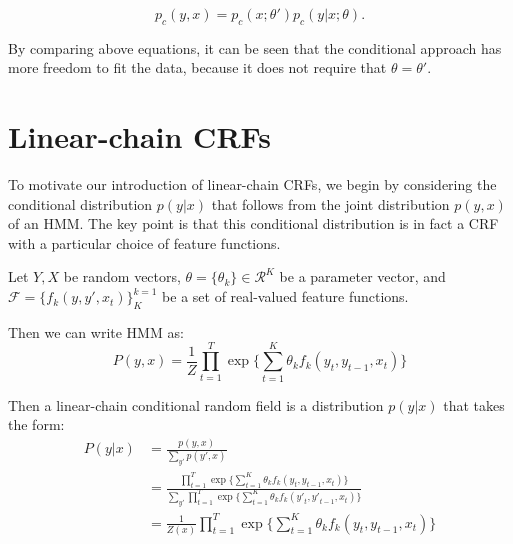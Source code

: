 \documentclass{article}
\begin{document}
\[p_c(y, x) = p_c(x; \theta')p_c(y|x; \theta).\]

By comparing above equations, it can be seen that the conditional
approach has more freedom to fit the data, because it does not require that $\theta = \theta'$. 



\section{Linear-chain CRFs}
To motivate our introduction of linear-chain CRFs, we begin by considering the conditional distribution $p(y|x)$ that follows from the joint distribution $p(y,x)$ of an HMM. The key point is that this conditional distribution is in fact a CRF with a particular choice of feature functions.

Let $Y,X$ be random vectors, $\theta = \{\theta_k\} \in \mathcal{R}^K$ be a parameter vector, and $\mathcal{F} = \{f_k(y,y',x_t)\}_{K}^{k=1}$ be a set of real-valued feature functions.

Then we can write HMM as:
\[ P(y,x) = \frac{1}{Z} \prod_{t=1}^{T} \exp \Bigg\{ \sum_{t=1}^{K} \theta_k f_k (y_t,y_{t-1},x_t) \Bigg\} \]


Then a linear-chain conditional random field is a distribution $p(y|x)$ that takes the form:
\begin{align}
 P(y|x) &= \frac{p(y,x)}{\sum_{y'} p(y',x)} \nonumber \\
  &= \frac{\prod_{t=1}^{T} \exp \Bigg\{ \sum_{t=1}^{K} \theta_k f_k (y_t,y_{t-1},x_t) \Bigg\}}{\sum_{y'} \prod_{t=1}^{T} \exp \Bigg\{ \sum_{t=1}^{K} \theta_k f_k ({y'}_t,{y'}_{t-1},x_t) \Bigg\}}  \nonumber \\
 &= \frac{1}{Z(x)} \prod_{t=1}^{T} \exp \Bigg\{ \sum_{t=1}^{K} \theta_k f_k (y_t,y_{t-1},x_t) \Bigg\} \nonumber
 \end{align}
\end{document}
